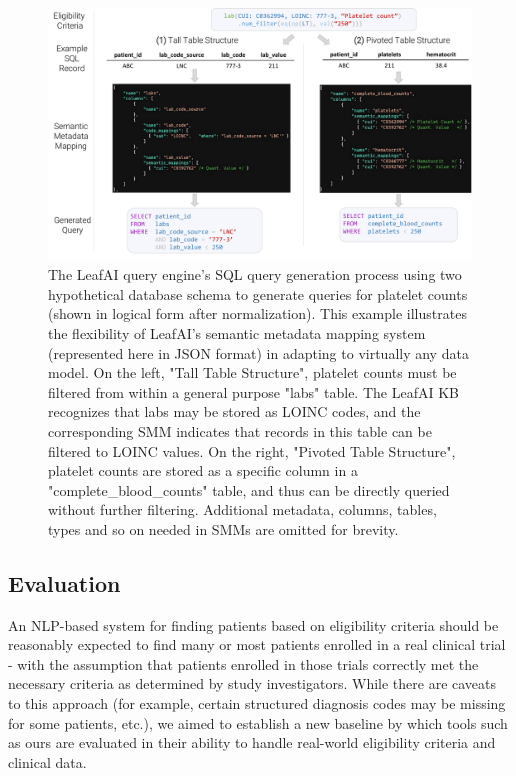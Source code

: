 \documentclass[../main.tex]{subfiles}
\begin{document}
\begin{figure}[h]
  \includegraphics[scale=0.47]{figures/leafai_smm.pdf}  
\caption{The LeafAI query engine's SQL query generation process using two hypothetical database schema to generate queries for platelet counts (shown in logical form after normalization). This example illustrates the flexibility of LeafAI's semantic metadata mapping system (represented here in JSON format) in adapting to virtually any data model. On the left, "Tall Table Structure", platelet counts must be filtered from within a general purpose "labs" table. The LeafAI KB recognizes that labs may be stored as LOINC codes, and the corresponding SMM indicates that records in this table can be filtered to LOINC values. On the right, "Pivoted Table Structure", platelet counts are stored as a specific column in a "complete\_blood\_counts" table, and thus can be directly queried without further filtering. Additional metadata, columns, tables, types and so on needed in SMMs are omitted for brevity.}
\label{fig_leafai_smm}
\end{figure}

\subsection*{Evaluation}

An NLP-based system for finding patients based on eligibility criteria should be reasonably expected to find many or most patients enrolled in a real clinical trial - with the assumption that patients enrolled in those trials correctly met the necessary criteria as determined by study investigators. While there are caveats to this approach (for example, certain structured diagnosis codes may be missing for some patients, etc.), we aimed to establish a new baseline by which tools such as ours are evaluated in their ability to handle real-world eligibility criteria and clinical data. 
\end{document}
